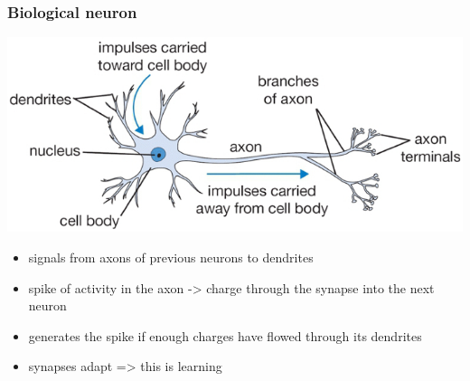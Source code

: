 \documentclass[xcolor=table]{beamer}
\begin{document}
\begin{mdframe}%

\frametitle{Biological neuron}\label{heading-sec-biological-neuron}%

\noindent{}\includegraphics[keepaspectratio=true,width=\dimmin{}{\dimwidth{0.90}}]{images/neuron}{}%

\begin{itemize}%

\item{}
signals from axons of previous neurons to dendrites%

\item{}
spike of activity in the axon -\textgreater{} charge through the synapse into the next neuron%

\item{}
generates the spike if enough charges have flowed through its dendrites%

\item{}
synapses adapt =\textgreater{} this is learning%
\end{itemize}%
\end{mdframe}\label{sec-biological-neuron}%
\end{document}
